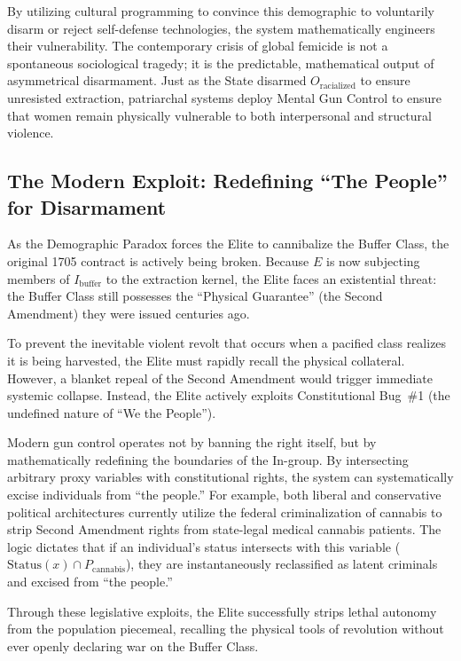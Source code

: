 \documentclass[12pt,openany]{book}
\begin{document}
By utilizing cultural programming to convince this demographic to voluntarily disarm or reject self-defense technologies, the system mathematically engineers their vulnerability. The contemporary crisis of global femicide is not a spontaneous sociological tragedy; it is the predictable, mathematical output of asymmetrical disarmament. Just as the State disarmed $O_{\text{racialized}}$ to ensure unresisted extraction, patriarchal systems deploy Mental Gun Control to ensure that women remain physically vulnerable to both interpersonal and structural violence.

\subsection{The Modern Exploit: Redefining ``The People'' for Disarmament}

As the Demographic Paradox forces the Elite to cannibalize the Buffer Class, the original 1705 contract is actively being broken. Because $E$ is now subjecting members of $I_{\text{buffer}}$ to the extraction kernel, the Elite faces an existential threat: the Buffer Class still possesses the ``Physical Guarantee'' (the Second Amendment) they were issued centuries ago.

To prevent the inevitable violent revolt that occurs when a pacified class realizes it is being harvested, the Elite must rapidly recall the physical collateral. However, a blanket repeal of the Second Amendment would trigger immediate systemic collapse. Instead, the Elite actively exploits Constitutional Bug~\#1 (the undefined nature of ``We the People'').

Modern gun control operates not by banning the right itself, but by mathematically redefining the boundaries of the In-group. By intersecting arbitrary proxy variables with constitutional rights, the system can systematically excise individuals from ``the people.'' For example, both liberal and conservative political architectures currently utilize the federal criminalization of cannabis to strip Second Amendment rights from state-legal medical cannabis patients. The logic dictates that if an individual's status intersects with this variable ($\text{Status}(x) \cap P_{\text{cannabis}}$), they are instantaneously reclassified as latent criminals and excised from ``the people.''

Through these legislative exploits, the Elite successfully strips lethal autonomy from the population piecemeal, recalling the physical tools of revolution without ever openly declaring war on the Buffer Class.
\end{document}
